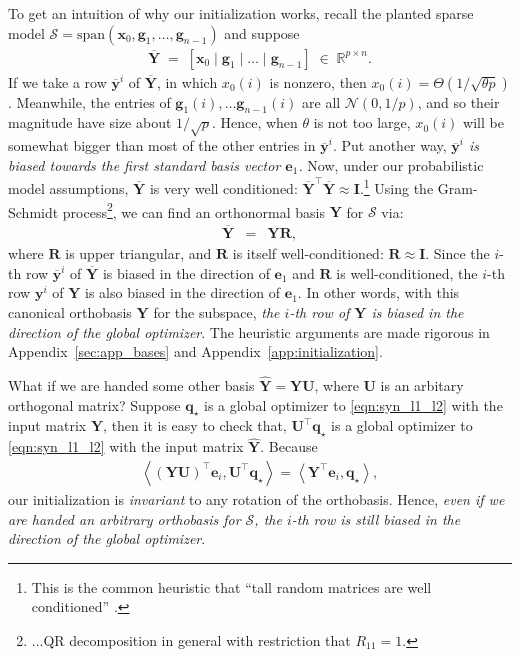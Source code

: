 \documentclass[11pt, journal, final]{IEEEtran}
\numberwithin{equation}{section}
\newcommand{\R}{\mathbb{R}}
\newcommand{\mb}{\mathbf}
\newcommand{\mc}{\mathcal}
\newcommand{ \brac }[1]{\left[ #1 \right]}
\newcommand{\innerprod}[2]{\left\langle #1,  #2 \right\rangle}
\begin{document}
{To get an intuition of why our initialization works, recall the planted sparse model
$\mc S = \mathrm{span}( \mb x_0, \mb g_1, \dots, \mb g_{n-1} )$ and suppose
\begin{align}\label{eqn:Y-bar}
	\overline{\mb Y}\;= \;\brac{ \mb x_0 \mid \mb g_1 \mid \dots \mid \mb g_{n-1} } \;\in\; \R^{p \times n}.
\end{align}
If we take a row $\overline{\mb y}^i$ of $\overline{\mb Y}$, in which $x_0(i)$ is nonzero, then $x_0(i) = \Theta\left(1/\sqrt{\theta p}\right)$. Meanwhile, the entries of $\mb g_1(i), \dots \mb g_{n-1}(i)$ are all $\mc N(0,1/p)$, and so their magnitude have size about $1/\sqrt{p}$. Hence, when $\theta$ is not too large, $x_0(i)$ will be somewhat bigger than most of the other entries in $\overline{\mb y}^i$. Put another way, {\em $\overline{\mb y}^i$ is biased towards the first standard basis vector $\mb e_1$.} Now, under our probabilistic model assumptions, $\overline{\mb Y}$ is very well conditioned: $\overline{\mb Y}^\top \overline{\mb Y} \approx \mb I$.\footnote{This is the common heuristic that ``tall random matrices are well conditioned'' {\cite{veryshynin2011matrix}}.} Using the Gram-Schmidt process\footnote{...QR decomposition in general with restriction that $R_{11} = 1$.}, we can find an orthonormal basis $\mb Y$ for $\mc S$ via:
\begin{eqnarray} \label{eqn:Y-Z-R}
\overline{\mb Y} &=& \mb Y \mb R,
\end{eqnarray}
where $\mb R$ is upper triangular, and $\mb R$ is itself well-conditioned: $\mb R \approx \mb I$. Since the $i$-th row $\overline{\mb y}^i$ of $\overline{\mb Y}$ is biased in the direction of $\mb e_1$ and $\mb R$ is well-conditioned, the $i$-th row $\mb y^i$ of $\mb Y$ is also biased in the direction of $\mb e_1$. In other words, with this canonical orthobasis $\mb Y$ for the subspace, {\em the $i$-th row of $\mb Y$ is biased in the direction of the global optimizer}. The heuristic arguments are made rigorous in Appendix~\ref{sec:app_bases} and Appendix~\ref{app:initialization}.

What if we are handed some other basis $\widehat{\mb Y} = \mb Y \mb U$, where $\mb U$ is an arbitary orthogonal matrix? Suppose $\mb q_\star$ is a global optimizer to \eqref{eqn:syn_l1_l2} with the input matrix $\mb Y$, then it is easy to check that, $\mb U^\top \mb q_\star$ is a global optimizer to \eqref{eqn:syn_l1_l2} with the input matrix $\widehat{\mb Y}$. Because
\begin{align*}
\innerprod{(\mb Y \mb U)^\top \mb e_i}{\mb U^\top \mb q_\star} = \innerprod{\mb Y^\top \mb e_i}{\mb q_\star},
\end{align*}
our initialization is {\em invariant} to any rotation of the orthobasis. Hence, {\em even if we are handed an arbitrary orthobasis for $\mc S$, the $i$-th row is still biased in the direction of the global optimizer}.
\par\smallskip

}
\end{document}
